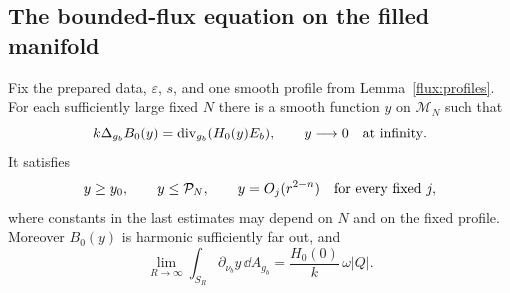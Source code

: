 \subsection{The bounded-flux equation on the filled manifold}

\begin{proposition}
\label{flux:conversion-solve}
Fix the prepared data, $\varepsilon$, $s$, and one smooth profile from
Lemma~\ref{flux:profiles}.  For each sufficiently large fixed $N$ there is
a smooth function $y$ on $\mathcal M_N$ such that
\begin{equation}
 k\Delta_{g_b}B_0(y)=\operatorname{div}_{g_b}(H_0(y)E_b),
 \qquad y\longrightarrow0\quad\hbox{at infinity}.
 \label{flux:conversion-equation}
\end{equation}
It satisfies
\begin{equation}
 y\geq y_0,\qquad y\leq\mathcal P_N,
 \qquad y=O_j(r^{2-n})\quad\hbox{for every fixed }j,
 \label{flux:y-bounds}
\end{equation}
where constants in the last estimates may depend on $N$ and on the fixed
profile.  Moreover $B_0(y)$ is harmonic sufficiently far out, and
\begin{equation}
 \lim_{R\to\infty}\int_{S_R}\partial_{\nu_b}y\,\dd A_{g_b}
 =\frac{H_0(0)}{k}\,\omega|Q|.
 \label{flux:y-flux}
\end{equation}
\end{proposition}

